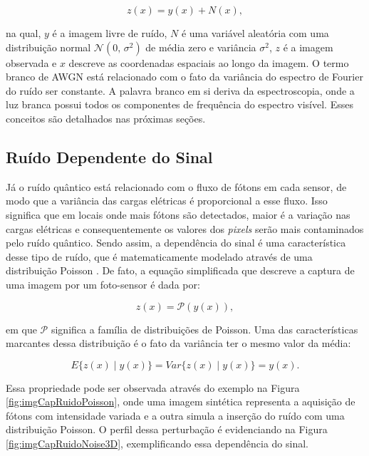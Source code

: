 \begin{equation}
z(x) = y(x) + N(x),
\label{eq:eqCapRuidoTermico}
\end{equation}

\noindent na qual, $y$ é a imagem livre de ruído, $N$ é uma variável aleatória com uma distribuição normal $\mathcal{N}(0,\,\sigma^{2})$ de média zero e variância $\sigma^{2}$, $z$ é a imagem observada e $x$ descreve as coordenadas espaciais ao longo da imagem. O termo branco de \acs{AWGN} está relacionado com  o fato da variância do espectro de Fourier do ruído ser constante. A palavra branco em si deriva da espectroscopia, onde a luz branca possui todos os componentes de frequência do espectro visível. Esses conceitos são detalhados nas próximas seções.


\subsection{Ruído Dependente do Sinal}

Já o ruído quântico está relacionado com o fluxo de fótons em cada sensor, de modo que a variância das cargas elétricas é proporcional a esse fluxo. Isso significa que em locais onde mais fótons são detectados, maior é a variação nas cargas elétricas e consequentemente os valores dos \textit{pixels} serão mais contaminados pelo ruído quântico. Sendo assim, a dependência do sinal é uma característica desse tipo de ruído, que é matematicamente modelado através de uma distribuição Poisson \cite{bertalmiodenoising2018}. De fato, a equação simplificada que descreve a captura de uma imagem por um foto-sensor é dada por:

\begin{equation}
z(x) =  \mathcal{P}(y(x)),
\label{eq:eqCapRuidoQuantico}
\end{equation}

\noindent em que $\mathcal{P}$ significa a família de distribuições de Poisson. Uma das características marcantes dessa distribuição é o fato da variância ter o mesmo valor da média:

\begin{equation}
 E\{z(x)\mid y(x)\} =  Var\{z(x)\mid y(x)\} = y(x).
\label{eq:eqCapRuidoQuanticoMediaVar}
\end{equation}

Essa propriedade pode ser observada através do exemplo na Figura \ref{fig:imgCapRuidoPoisson}, onde uma imagem sintética representa a aquisição de fótons com intensidade variada e a outra simula a inserção do ruído com uma distribuição Poisson. O perfil dessa perturbação é evidenciando na Figura \ref{fig:imgCapRuidoNoise3D}, exemplificando essa dependência do sinal. 


